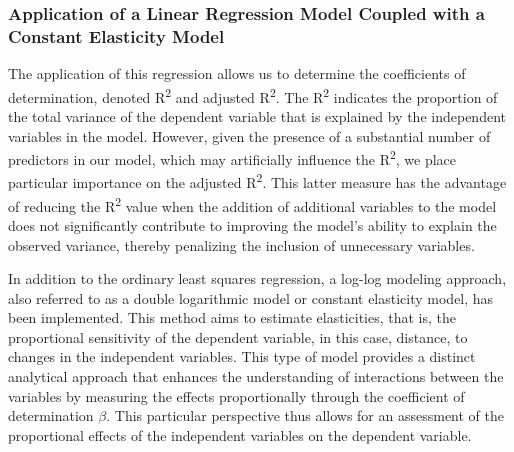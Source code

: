 \begin{refsegment}
\subsubsection*{Application of a Linear Regression Model Coupled with a Constant Elasticity Model
    \label{chap5:modeles-OLS-log-log}
    }

The application of this regression allows us to determine the coefficients of determination, denoted R\textsuperscript{2} and adjusted R\textsuperscript{2}. The R\textsuperscript{2} indicates the proportion of the total variance of the dependent variable that is explained by the independent variables in the model. However, given the presence of a substantial number of predictors in our model, which may artificially influence the R\textsuperscript{2}, we place particular importance on the adjusted R\textsuperscript{2}. This latter measure has the advantage of reducing the R\textsuperscript{2} value when the addition of additional variables to the model does not significantly contribute to improving the model's ability to explain the observed variance, thereby penalizing the inclusion of unnecessary variables.%

In addition to the ordinary least squares regression, a log-log modeling approach, also referred to as a double logarithmic model or constant elasticity model, has been implemented. This method aims to estimate elasticities, that is, the proportional sensitivity of the dependent variable, in this case, distance, to changes in the independent variables. This type of model provides a distinct analytical approach that enhances the understanding of interactions between the variables by measuring the effects proportionally through the coefficient of determination \(\beta\). This particular perspective thus allows for an assessment of the proportional effects of the independent variables on the dependent variable.%


\end{refsegment}
